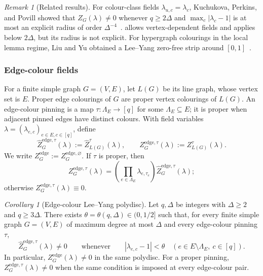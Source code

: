 \documentclass[11pt,reqno]{article}
\theoremstyle{plain}
\newtheorem{corollary}[theorem]{Corollary}
\theoremstyle{definition}
\theoremstyle{remark}
\newtheorem{remark}[theorem]{Remark}
\newtheorem{corollary}[corollary]{Corollary}
\theoremstyle{definition}
\theoremstyle{remark}
\newtheorem{remark}[remark]{Remark}
\newcommand{\abs}[1]{\left|#1\right|}
\newcommand{\Deg}{\Delta}                        %
\newcommand{\Zpart}{Z}                           %
\newcommand{\colours}{[q]}                        %
\newcommand{\Zpin}[2]{Z_{#1}^{#2}}
\newcommand{\nZpin}[2]{\widehat Z_{#1}^{#2}}
\begin{document}
\begin{remark}[Related results]
\label{rem:lee-yang-related}
For colour-class fields \(\lambda_{u,c}=\lambda_c\), Kuchukova, Perkins,
and Povill showed that \(\Zpart_G(\lambda)\ne0\) whenever \(q\ge2\Deg\)
and \(\max_c|\lambda_c-1|\) is at most an explicit radius of order
\(\Deg^{-4}\)~\cite[Theorem~1.14 and
Corollary~1.15]{KuchukovaPerkinsPovill2026}.   allows
vertex-dependent fields and applies below \(2\Deg\), but its radius is
not explicit.  For hypergraph colourings in the local lemma regime, Liu
and Yu obtained a Lee--Yang zero-free strip around
\([0,1]\)~\cite{LiuYu2026}.
\end{remark}

\subsubsection{Edge-colour fields}

For a finite simple graph \(G=(V,E)\), let \(L(G)\) be its line graph,
whose vertex set is \(E\).  Proper edge colourings of \(G\) are proper
vertex colourings of \(L(G)\).  An edge-colour pinning is a map
\(\tau\colon\Lambda_E\to\colours\) for some \(\Lambda_E\subseteq E\); it is
proper when adjacent pinned edges have distinct colours.  With field
variables \(\lambda=(\lambda_{e,c})_{e\in E,c\in\colours}\), define
\begin{equation}\label{eq:edge-field-Z}
  \widehat Z_G^{\mathrm{edge},\tau}(\lambda)
  :=\nZpin{L(G)}{\tau}(\lambda),
  \qquad
  Z_G^{\mathrm{edge},\tau}(\lambda)
  :=\Zpin{L(G)}{\tau}(\lambda).
\end{equation}
We write \(Z_G^{\mathrm{edge}}:=Z_G^{\mathrm{edge},\varnothing}\).  If
\(\tau\) is proper, then
\begin{equation}\label{eq:edge-full-field-normalization}
  Z_G^{\mathrm{edge},\tau}(\lambda)
  =\left(\prod_{e\in\Lambda_E}\lambda_{e,\tau_e}\right)
    \widehat Z_G^{\mathrm{edge},\tau}(\lambda);
\end{equation}
otherwise \(Z_G^{\mathrm{edge},\tau}(\lambda)\equiv0\).

\begin{corollary}[Edge-colour Lee--Yang polydisc]
\label{cor:edge-lee-yang}
Let \(q,\Deg\) be integers with \(\Deg\ge2\) and \(q\ge3\Deg\).
There exists \(\theta=\theta(q,\Deg)\in(0,1/2]\) such that, for every
finite simple graph \(G=(V,E)\) of maximum degree at most \(\Deg\) and
every edge-colour pinning \(\tau\),
\[
  \widehat Z_G^{\mathrm{edge},\tau}(\lambda)\ne0
  \qquad\text{whenever}\qquad
  \abs{\lambda_{e,c}-1}<\theta
  \quad(e\in E\setminus\Lambda_E,\ c\in\colours).
\]
In particular, \(Z_G^{\mathrm{edge}}(\lambda)\ne0\) in the same
polydisc.  For a proper pinning,
\(Z_G^{\mathrm{edge},\tau}(\lambda)\ne0\) when the same condition is
imposed at every edge-colour pair.
\end{corollary}
\end{document}
